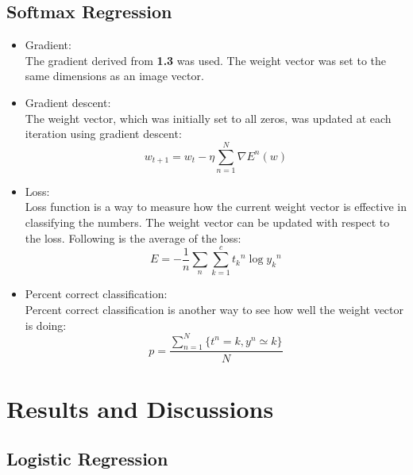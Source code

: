 \documentclass[11pt,twoside]{article}
\begin{document}
\subsection{Softmax Regression}
\begin{itemize}
\item Gradient:\\
The gradient derived from \textbf{1.3} was used. The weight vector was set to the same dimensions as an image vector.\\

\item Gradient descent:\\
The weight vector, which was initially set to all zeros, was updated at each iteration using gradient descent:\\
\begin{equation}
w_{t+1} = w_{t} - \eta \sum_{n = 1}^{N} \nabla E^{n}(w)
\end{equation}

\item Loss:\\
Loss function is a way to measure how the current weight vector is effective in classifying the numbers. The weight vector can be updated with respect to the loss. Following is the average of the loss:\\
\begin{equation}
E = -\frac{1}{n}\sum_{n}^{} \sum_{k=1}^{c}{t_{k}}^{n}\log{y_{k}}^{n}
\end{equation}

\item Percent correct classification:\\
Percent correct classification is another way to see how well the weight vector is doing:\\
\begin{equation}
p = \frac{\sum_{n=1}^{N}\lbrace t^{n} = k, y^{n} \simeq k\rbrace}{N}
\end{equation}
\end{itemize}





\section{Results and Discussions}

\subsection{Logistic Regression}
\end{document}
